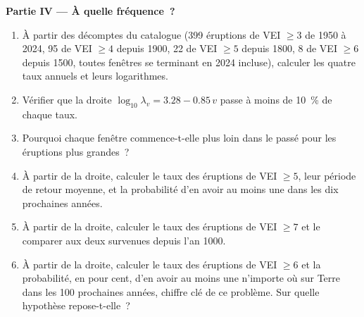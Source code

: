 \begin{problem}
\noindent\textbf{Partie IV --- À quelle fréquence~?}
\begin{enumerate}[resume]
\item À partir des décomptes du catalogue (399 éruptions de VEI $\ge 3$ de 1950 à
2024, 95 de VEI $\ge 4$ depuis 1900, 22 de VEI $\ge 5$ depuis 1800, 8 de VEI $\ge 6$ depuis
1500, toutes fenêtres se terminant en 2024 incluse), calculer les quatre taux annuels et
leurs logarithmes.
\item Vérifier que la droite $\log_{10}\lambda_v = 3.28 - 0.85\,v$ passe à moins de
\qty{10}{\percent} de chaque taux.
\item Pourquoi chaque fenêtre commence-t-elle plus loin dans le passé pour les éruptions plus grandes~?
\item À partir de la droite, calculer le taux des éruptions de VEI $\ge 5$, leur
période de retour moyenne, et la probabilité d'en avoir au moins une dans les dix prochaines années.
\item À partir de la droite, calculer le taux des éruptions de VEI $\ge 7$ et le comparer
aux deux survenues depuis l'an 1000.
\item À partir de la droite, calculer le taux des éruptions de VEI $\ge 6$ et la
probabilité, en pour cent, d'en avoir au moins une n'importe où sur Terre dans les 100
prochaines années, chiffre clé de ce problème. Sur quelle hypothèse repose-t-elle~?
\end{enumerate}
\end{problem}
